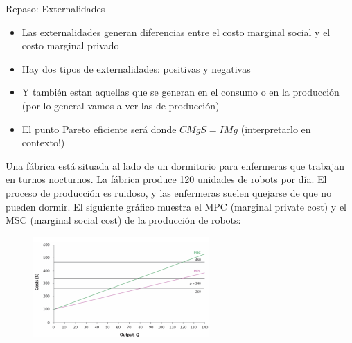 \documentclass{beamer}
\begin{document}
\begin{frame}{Repaso: Externalidades}
    
    \scriptsize

    \begin{itemize}
        \item Las externalidades generan diferencias entre el costo marginal social y el costo marginal privado
        \item Hay dos tipos de externalidades: positivas y negativas
        \item Y también estan aquellas que se generan en el consumo o en la producción (por lo general vamos a ver las de producción)
        \item El punto Pareto eficiente será donde $CMgS = IMg$ (interpretarlo en contexto!)
    \end{itemize}

    Una fábrica está situada al lado de un dormitorio para enfermeras que trabajan en turnos nocturnos. La fábrica produce 120 unidades de robots por día. El proceso de producción es ruidoso, y las enfermeras suelen quejarse de que no pueden dormir. El siguiente gráfico muestra el MPC (marginal private cost) y el MSC (marginal social cost) de la producción de robots:

    \begin{figure}[h!]
        \centering
        \includegraphics[width=0.6\textwidth]{../Figures/Externalidades_Ejercicio.png}
    \end{figure}

\end{frame}
\end{document}
